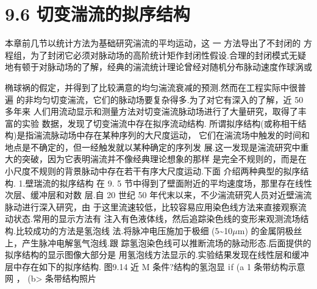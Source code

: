 \section*{9.6  切变湍流的拟序结构}

本章前几节以统计方法为基础研究湍流的平均运动，这 一 方法导出了不封闭的 方程组，为了封闭它必须对脉动场的高阶统计矩作封闭性假设.合理的封闭模式无疑 地有顿于对脉动场的了解，经典的湍流统计理论曾经对随机分布脉动速度作球涡或

椭球祸的假定，并得到了比较满意的均匀湍流衰减的预测.然而在工程实际中很普遍 的非均匀切变湍流，它们的脉动场要复杂得多.为了对它有深入的了解，近 50 多年来 人们用流动显示和测量方法对切变湍流脉动场进行了大量研究，取得了丰富的实验 数据，发现了切变湍流中存在拟序流动结构. 所谓拟序结构(或称相干结构)是指湍流脉动场中存在某种序列的大尺度运动， 它们在湍流场中触发的时间和地点是不确定的，但一经触发就以某种确定的序列发 展.这一发现是湍流研究中重大的突破，因为它表明湍流并不像经典理论想象的那样 是完全不规则的，而是在小尺度不规则的背景脉动中存在若干有序大尺度运动.下面 介绍两种典型的拟序结构. 1.壁瑞流的拟序结构 在 9. 5 节中得到了壁面附近的平均速度场，那里存在线性次层、缓冲层和对数 层.自 20 世纪 50 年代末以来，不少湍流研究人员对近壁湍流脉动进行深入研究，由 于这里流速较低，比较容易应用染色线方法来直接观察流动状态.常用的显示方法有 注入有色液体线，然后追踪染色线的变形来观测流场结构.比较成功的方法是氢泡线 法.将脉冲电压施加于极细 (5\textasciitilde{}10$\mu$m) 的金属阴极丝上，产生脉冲电解氢气泡线.跟 踪氢泡染色线可以推断流场的脉动形态.后面提供的拟序结构的显示图像大部分是 用氢泡线方法显示的.实验结果发现在线性层和缓冲层中存在如下的拟序结构. 图9.14 近 M 条件?结构的氢泡显 ${\rm i}$f (a 1 条带纺构示意网 ， (b> 条带结构照片

